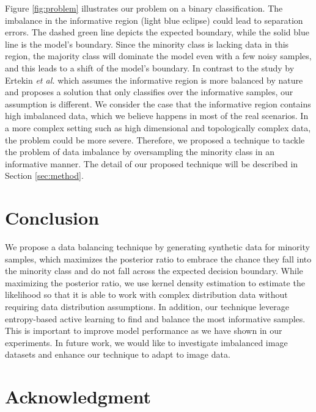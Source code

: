 \documentclass[final,5p,times, twocolumn]{elsarticle}
\begin{document}
	Figure \ref{fig:problem} illustrates our problem on a binary classification. The imbalance in the informative region (light blue eclipse) could lead to separation errors. The dashed green line depicts the expected boundary, while the solid blue line is the model's boundary. Since the minority class is lacking  data in this region, the majority class will dominate the model even with a few noisy samples, and this leads to a shift of the model's boundary. In contrast to the study by Ertekin \textit{et al.} \cite{ertekin_learning_2007} which assumes the informative region is more balanced by nature and proposes a solution that only classifies over the informative samples, our assumption is different. We consider the case that the informative region contains high imbalanced data, which we believe happens in most of the real scenarios. In a more complex setting such as high dimensional and topologically complex data, the problem could be more severe. Therefore, we proposed a technique to tackle the problem of data imbalance by oversampling the minority class in an informative manner. The detail of our proposed technique will be described in Section \ref{sec:method}.         
	
	
	
	
	
	
	
	
	
	
	\section {Conclusion}
	\label{sec:conclusion}
	We propose a data balancing technique by generating synthetic data for minority samples, which maximizes the posterior ratio to embrace the chance they fall into the minority class and do not fall across the expected decision boundary. While maximizing the posterior ratio, we use kernel density estimation to estimate the likelihood so that it is able to work with complex distribution data without requiring data distribution assumptions. In addition, our technique leverage entropy-based active learning to find and balance the most informative samples. This is important to improve model performance as we have shown in our experiments. In future work, we would like to investigate imbalanced image datasets and enhance our technique to adapt to image data.     
	
	\section*{Acknowledgment}
	
\end{document}
